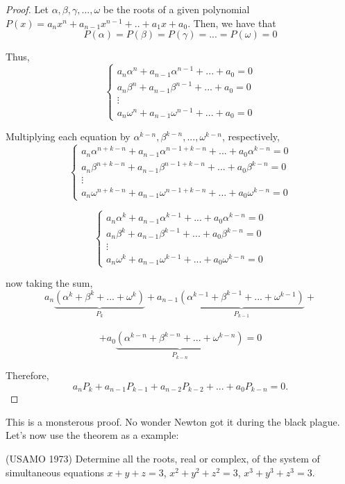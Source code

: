 \begin{proof}
\small %

Let $\alpha,\beta,\gamma,...,\omega$ be the roots of a given polynomial $P(x)=a_nx^n+a_{n-1}x^{n-1}+..+a_1x+a_0$. Then, we have that
\[P(\alpha)=P(\beta)=P(\gamma)=...=P(\omega)=0\]

Thus,
\[
\begin{cases}
a_n\alpha^n+a_{n-1}\alpha^{n-1}+...+a_0=0\\
a_n\beta^n+a_{n-1}\beta^{n-1}+...+a_0=0\\
\vdots\\
a_n\omega^n+a_{n-1}\omega^{n-1}+...+a_0=0
\end{cases}
\]

Multiplying each equation by $\alpha^{k-n},\beta^{k-n},...,\omega^{k-n}$, respectively,
\[
\begin{cases}
a_n\alpha^{n+k-n}+a_{n-1}\alpha^{n-1+k-n}+...+a_0\alpha^{k-n}=0\\
a_n\beta^{n+k-n}+a_{n-1}\beta^{n-1+k-n}+...+a_0\beta^{k-n}=0\\
\vdots\\
a_n\omega^{n+k-n}+a_{n-1}\omega^{n-1+k-n}+...+a_0\omega^{k-n}=0
\end{cases}
\]

\[
\begin{cases}
a_n\alpha^{k}+a_{n-1}\alpha^{k-1}+...+a_0\alpha^{k-n}=0\\
a_n\beta^{k}+a_{n-1}\beta^{k-1}+...+a_0\beta^{k-n}=0\\
\vdots\\
a_n\omega^{k}+a_{n-1}\omega^{k-1}+...+a_0\omega^{k-n}=0
\end{cases}
\]

now taking the sum,
\[
a_n\underbrace{(\alpha^k+\beta^k+...+\omega^k)}_{P_k}+a_{n-1}\underbrace{(\alpha^{k-1}+\beta^{k-1}+...+\omega^{k-1})}_{P_{k-1}}+\]\\
\[+a_0\underbrace{(\alpha^{k-n}+\beta^{k-n}+...+\omega^{k-n})}_{P_{k-n}}=0
\]

Therefore,
\[a_nP_k+a_{n-1}P_{k-1}+a_{n-2}P_{k-2}+...+a_0P_{k-n}=0.\]

\end{proof}
This is a monsterous proof. No wonder Newton got it during the black plague.\\
Let's now use the theorem as a example:\\
\begin{example}
    (USAMO 1973) Determine all the roots, real or complex, of the system of simultaneous equations 
    $x+y+z=3$,
    $x^2+y^2+z^2=3$,
    $x^3+y^3+z^3=3$.
\end{example}
